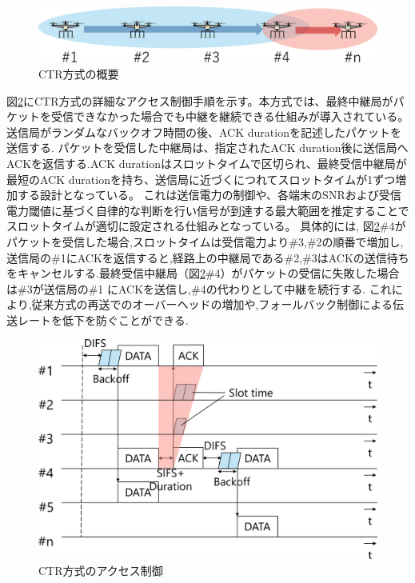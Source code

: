 \documentclass[a4paper,10.5pt]{ltjsarticle}
\begin{document}
\begin{figure}[H]
  \centering
  \includegraphics[width=\linewidth]{CTR_topology.pdf} %
  \caption{CTR方式の概要}
  \label{fig:CTR_topology} %
\end{figure}

図\ref{fig:CTR_accsess}にCTR方式の詳細なアクセス制御手順を示す。本方式では、最終中継局がパケットを受信できなかった場合でも中継を継続できる仕組みが導入されている。送信局がランダムなバックオフ時間の後、ACK durationを記述したパケットを送信する.
パケットを受信した中継局は、指定されたACK duration後に送信局へACKを返信する.ACK durationはスロットタイムで区切られ、最終受信中継局が最短のACK durationを持ち、送信局に近づくにつれてスロットタイムが1ずつ増加する設計となっている。
これは送信電力の制御や、各端末のSNRおよび受信電力閾値に基づく自律的な判断を行い信号が到達する最大範囲を推定することでスロットタイムが適切に設定される仕組みとなっている。
具体的には, 図\ref{fig:CTR_accsess}\#4がパケットを受信した場合,スロットタイムは受信電力より\#3,\#2の順番で増加し,送信局の\#1にACKを返信すると,経路上の中継局である\#2,\#3はACKの送信待ちをキャンセルする.最終受信中継局（図\ref{fig:CTR_accsess}\#4）がパケットの受信に失敗した場合は\#3が送信局の\#1 にACKを送信し,\#4の代わりとして中継を続行する.
これにより,従来方式の再送でのオーバーヘッドの増加や,フォールバック制御による伝送レートを低下を防ぐことができる.

\begin{figure}[H]
  \centering
  \includegraphics[width=\linewidth]{CTR_accsess.pdf} %
  \caption{CTR方式のアクセス制御}
  \label{fig:CTR_accsess} %
\end{figure}
\end{document}
